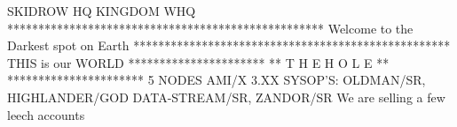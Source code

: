  
 
        SKIDROW HQ        KINGDOM WHQ
***************************************************
      Welcome to the Darkest spot on Earth
***************************************************
              THIS is our WORLD
            **********************
        **  T  H  E     H  O  L  E  **
            **********************
            5 NODES      AMI/X 3.XX
SYSOP'S:
        OLDMAN/SR, HIGHLANDER/GOD
        DATA-STREAM/SR, ZANDOR/SR
     We are selling a few leech accounts  


